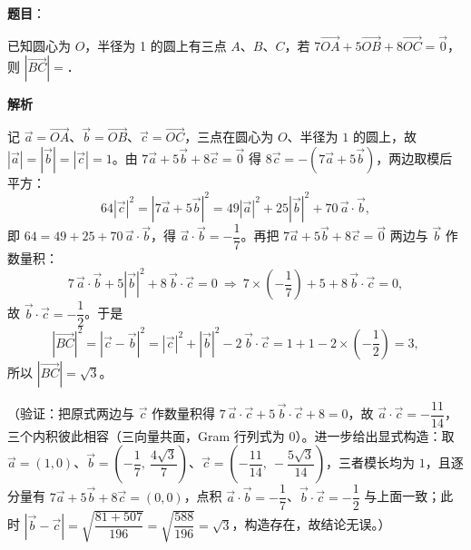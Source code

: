 \begin{answer}

\textbf{题目}：

已知圆心为 \(O\)，半径为 1 的圆上有三点 \(A\)、\(B\)、\(C\)，若 \(7\overrightarrow{OA}+5\overrightarrow{OB}+8\overrightarrow{OC}=\vec{0}\)，则 \(\left|\overrightarrow{BC}\right|=\)\gkblank{}．

\textbf{解析}

记 \(\vec a=\overrightarrow{OA}\)、\(\vec b=\overrightarrow{OB}\)、\(\vec c=\overrightarrow{OC}\)，三点在圆心为 \(O\)、半径为 \(1\) 的圆上，故 \(|\vec a|=|\vec b|=|\vec c|=1\)。由 \(7\vec a+5\vec b+8\vec c=\vec0\) 得 \(8\vec c=-(7\vec a+5\vec b)\)，两边取模后平方：
\nopagebreak[4]
\[
64|\vec c|^{2}=\left|7\vec a+5\vec b\right|^{2}=49|\vec a|^{2}+25|\vec b|^{2}+70\,\vec a\cdot\vec b,
\]
即 \(64=49+25+70\,\vec a\cdot\vec b\)，得 \(\vec a\cdot\vec b=-\dfrac{1}{7}\)。再把 \(7\vec a+5\vec b+8\vec c=\vec0\) 两边与 \(\vec b\) 作数量积：
\nopagebreak[4]
\[
7\,\vec a\cdot\vec b+5|\vec b|^{2}+8\,\vec b\cdot\vec c=0\ \Longrightarrow\ 7\times\left(-\frac{1}{7}\right)+5+8\,\vec b\cdot\vec c=0,
\]
故 \(\vec b\cdot\vec c=-\dfrac{1}{2}\)。于是
\nopagebreak[4]
\[
\left|\overrightarrow{BC}\right|^{2}=\left|\vec c-\vec b\right|^{2}=|\vec c|^{2}+|\vec b|^{2}-2\,\vec b\cdot\vec c=1+1-2\times\left(-\frac{1}{2}\right)=3,
\]
所以 \(\left|\overrightarrow{BC}\right|=\sqrt{3}\)。

（验证：把原式两边与 \(\vec c\) 作数量积得 \(7\,\vec a\cdot\vec c+5\,\vec b\cdot\vec c+8=0\)，故 \(\vec a\cdot\vec c=-\dfrac{11}{14}\)，三个内积彼此相容（三向量共面，Gram 行列式为 \(0\)）。进一步给出显式构造：取 \(\vec a=(1,0)\)、\(\vec b=\left(-\dfrac{1}{7},\ \dfrac{4\sqrt{3}}{7}\right)\)、\(\vec c=\left(-\dfrac{11}{14},\ -\dfrac{5\sqrt{3}}{14}\right)\)，三者模长均为 \(1\)，且逐分量有 \(7\vec a+5\vec b+8\vec c=(0,0)\)，点积 \(\vec a\cdot\vec b=-\dfrac{1}{7}\)、\(\vec b\cdot\vec c=-\dfrac{1}{2}\) 与上面一致；此时 \(\left|\vec b-\vec c\right|=\sqrt{\dfrac{81+507}{196}}=\sqrt{\dfrac{588}{196}}=\sqrt{3}\)，构造存在，故结论无误。）


\end{answer}
